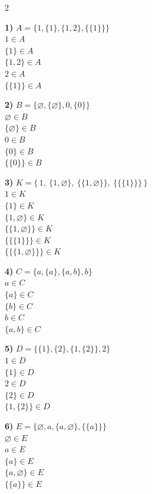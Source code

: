\documentclass[12pt]{article}
\begin{document}
\begin{multicols}{2}
\bigskip

\textbf{1)} 
$A = \{1, \{1\}, \{1,2\}, \{\{1\}\}\}$\\
$1 \in A$\\
$\{1\} \in A$\\
$\{1,2\} \in A$\\
$2 \in A$\\
$\{\{1\}\} \in A$\\

\bigskip

\textbf{2)} 
$B = \{\varnothing, \{\varnothing\}, 0, \{0\}\}$\\
$\varnothing \in B$\\
$\{\varnothing\} \in B$\\
$0 \in B$\\
$\{0\} \in B$\\
$\{\{0\}\} \in B$\\

\bigskip

\textbf{3)} 
$K = \{\, 1,\ \{1,\varnothing\},\ \{\{1,\varnothing\}\},\ \{\{\{1\}\}\} \,\}$\\
$1 \in K$\\
$\{1\} \in K$\\
$\{1,\varnothing\} \in K$\\
$\{\{1,\varnothing\}\} \in K$\\
$\{\{\{1\}\}\} \in K$\\
$\{\{\{1,\varnothing\}\}\} \in K$\\

\bigskip

\textbf{4)} 
$C = \{a, \{a\}, \{a,b\}, b\}$\\
$a \in C$\\
$\{a\} \in C$\\
$\{b\} \in C$\\
$b \in C$\\
$\{a,b\} \in C$\\

\bigskip

\textbf{5)} 
$D = \{\{1\}, \{2\}, \{1,\{2\}\}, 2\}$\\
$1 \in D$\\
$\{1\} \in D$\\
$2 \in D$\\
$\{2\} \in D$\\
$\{1,\{2\}\} \in D$\\

\bigskip

\textbf{6)} 
$E = \{\varnothing, a, \{a,\varnothing\}, \{\{a\}\}\}$\\
$\varnothing \in E$\\
$a \in E$\\
$\{a\} \in E$\\
$\{a,\varnothing\} \in E$\\
$\{\{a\}\} \in E$\\


\end{multicols}
\end{document}
